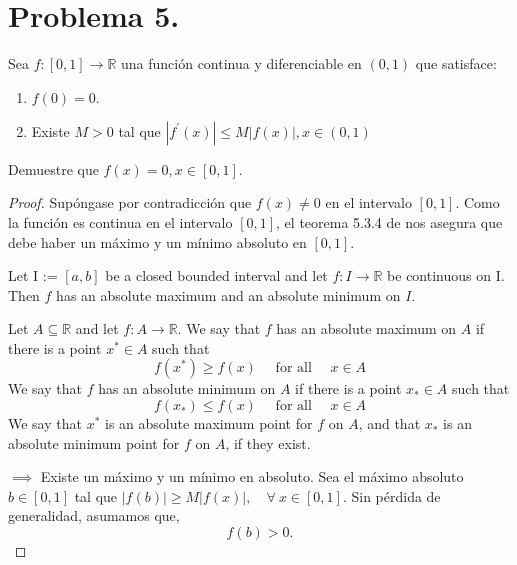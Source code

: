 \section{Problema 5.} Sea $f:[0,1] \rightarrow \mathbb{R}$ una función continua y diferenciable en $(0,1)$ que satisface:
\begin{enumerate}
    \item $f(0)=0.$
    \item Existe $M>0$ tal que $\left|f^{\prime}(x)\right| \leq M|f(x)|, x \in(0,1)$
\end{enumerate}
 Demuestre que $f(x)=0, x \in[0,1].$
 
 \begin{proof} Supóngase por contradicción que $f(x)\neq 0$ en el intervalo $[0,1]$. Como la función es continua en el intervalo $[0, 1]$, el teorema 5.3.4 de \cite{bartle2000introduction} nos asegura que debe haber un máximo y un mínimo absoluto en $[0,1]$.
 
 \begin{tcolorbox}[colback=gray!15,colframe=gray!1!gray,title=Teorema 5.3.4 (Máximo-Mínimo) de \cite{bartle2000introduction}]
Let I := $[a, b]$ be a closed bounded interval and let $f: I \rightarrow \mathbb{R}$ be continuous on I. Then $f$ has an absolute maximum and an absolute minimum on $I$.
\end{tcolorbox}
\begin{tcolorbox}[colback=blue!15,colframe=blue!1!blue,title=Definición 5.3.3 de \cite{bartle2000introduction}]
Let $A \subseteq \mathbb{R}$ and let $f: A \rightarrow \mathbb{R}$. We say that $f$ has an absolute maximum on $A$ if there is a point $x^{*} \in A$ such that
$$
f\left(x^{*}\right) \geq f(x) \quad \text { for all } \quad x \in A
$$
We say that $f$ has an absolute minimum on $A$ if there is a point $x_{*} \in A$ such that
$$
f\left(x_{*}\right) \leq f(x) \quad \text { for all } \quad x \in A
$$
We say that $x^{*}$ is an absolute maximum point for $f$ on $A$, and that $x_{*}$ is an absolute minimum point for $f$ on $A$, if they exist.
\end{tcolorbox}
 
  $\implies$ Existe un máximo  y un mínimo en absoluto. Sea el máximo absoluto $b\in[0,1]$ tal que $|f(b)|\geq M|f(x)|,\quad  \forall \ x\in [0,1]$. Sin pérdida de generalidad, asumamos que, 
  $$f(b)>0.$$
  

\end{proof}
